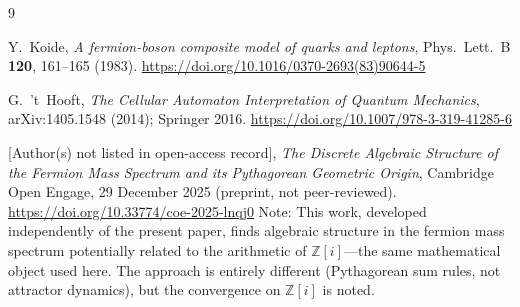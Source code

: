 \documentclass[11pt,a4paper]{article}
\begin{document}
\begin{thebibliography}{9}

Y.~Koide,
\textit{A fermion-boson composite model of quarks and leptons},
Phys.\ Lett.\ B \textbf{120}, 161--165 (1983).
\url{https://doi.org/10.1016/0370-2693(83)90644-5}

G.~'t~Hooft,
\textit{The Cellular Automaton Interpretation of Quantum Mechanics},
arXiv:1405.1548 (2014); Springer 2016.
\url{https://doi.org/10.1007/978-3-319-41285-6}

[Author(s) not listed in open-access record],
\textit{The Discrete Algebraic Structure of the Fermion Mass Spectrum
and its Pythagorean Geometric Origin},
Cambridge Open Engage, 29 December 2025 (preprint, not peer-reviewed).
\url{https://doi.org/10.33774/coe-2025-lnqj0}
\newline
Note: This work, developed independently of the present paper, finds
algebraic structure in the fermion mass spectrum potentially related to
the arithmetic of $\mathbb{Z}[i]$---the same mathematical object used
here. The approach is entirely different (Pythagorean sum rules,
not attractor dynamics), but the convergence on $\mathbb{Z}[i]$ is
noted.

\end{thebibliography}
\end{document}
